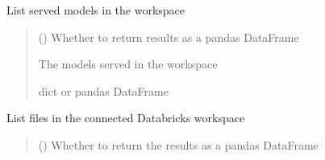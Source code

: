 \documentclass[letterpaper,10pt,english]{sphinxmanual}
\begin{document}
\begin{fulllineitems}
\begin{fulllineitems}
\label{\detokenize{aisquared.platform:aisquared.platform.DatabricksClient.DatabricksClient.list_served_models}}
\pysigstartsignatures
{}
\pysigstopsignatures
\sphinxAtStartPar
List served models in the workspace
\begin{quote}\begin{description}
\sphinxAtStartPar
{} (\sphinxstyleliteralemphasis{\sphinxupquote{ (}}\sphinxstyleliteralemphasis{\sphinxupquote{)}}) \textendash{} Whether to return results as a pandas DataFrame

\sphinxAtStartPar
{} \textendash{} The models served in the workspace

\sphinxAtStartPar
dict or pandas DataFrame

\end{description}\end{quote}

\end{fulllineitems}


\begin{fulllineitems}
\label{\detokenize{aisquared.platform:aisquared.platform.DatabricksClient.DatabricksClient.list_workspace}}
\pysigstartsignatures
{}
\pysigstopsignatures
\sphinxAtStartPar
List files in the connected Databricks workspace
\begin{quote}\begin{description}
\sphinxAtStartPar
{} (\sphinxstyleliteralemphasis{\sphinxupquote{ (}}\sphinxstyleliteralemphasis{\sphinxupquote{)}}) \textendash{} Whether to return the results as a pandas DataFrame


\end{description}
\end{quote}
\end{fulllineitems}
\end{fulllineitems}
\end{document}
